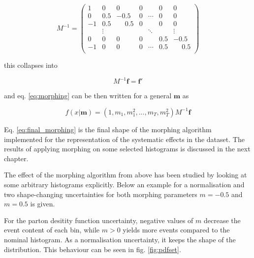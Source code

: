 \begin{equation*}
	M^{-1} = \left(\begin{matrix}
		 1 & 0   & 0   & 0 &        & 0 & 0 \\
		 0 & 0.5 &-0.5 & 0 & \cdots & 0 & 0 \\
		-1 & 0.5 &\phantom{-}0.5 & 0 &        & 0 & 0 \\
		   & \vdots &     &    & \ddots &  & \vdots \\
		 0 & 0   & 0   & 0 &        & 0.5 & -0.5 \\
		-1 & 0   & 0   & 0 & \cdots & 0.5 & \phantom{-}0.5 \\
	\end{matrix}\right)
\end{equation*}

this collapses into

\begin{equation*}
	M^{-1}\mathbf{f} = \mathbf{f}'
\end{equation*}

and eq. \ref{eq:morphing} can be then written for a general $\mathbf{m}$ as

\begin{equation}
	f(x|\mathbf{m}) = (1, m_1, m_1^2, ..., m_T, m^2_T) M^{-1}\mathbf{f}
	\label{eq:final_morphing}
\end{equation}

Eq. \ref{eq:final_morphing} is the final shape of the morphing algorithm implemented for the representation of the systematic effects in the dataset. The results of applying morphing on some selected histograms is discussed in the next chapter.


The effect of the morphing algorithm from above has been studied by looking at some arbitrary histograms explicitly. Below an example for a normalisation and two shape-changing uncertainties for both morphing parameters $m=-0.5$ and $m = 0.5$ is given.

For the parton desitity function uncertainty, negative values of $m$ decrease the event content of each bin, while $m>0$ yields more events compared to the nominal histogram. As a normalisation uncertainty, it keeps the shape of the distribution. This behaviour can be seen in fig. \ref{fig:pdfset}.

